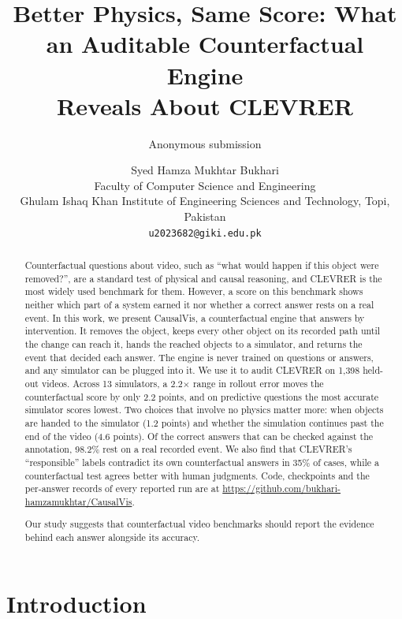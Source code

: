 \documentclass[10pt,twocolumn,letterpaper]{article}
\title{Better Physics, Same Score: What an Auditable Counterfactual Engine\\Reveals About CLEVRER}
\author{Anonymous submission}
\author{Syed Hamza Mukhtar Bukhari\\
  Faculty of Computer Science and Engineering\\
  Ghulam Ishaq Khan Institute of Engineering Sciences and Technology, Topi, Pakistan\\
  {\tt\small u2023682@giki.edu.pk}}
\date{}
\newif\ifanon
\newcommand{\sys}{CausalVis}
\begin{document}
\maketitle

\begin{abstract}
Counterfactual questions about video, such as ``what would happen if this object were removed?'', are a standard test of physical and causal reasoning, and CLEVRER is the most widely used benchmark for them.
However, a score on this benchmark shows neither which part of a system earned it nor whether a correct answer rests on a real event.
In this work, we present \sys{}, a counterfactual engine that answers by intervention.
It removes the object, keeps every other object on its recorded path until the change can reach it, hands the reached objects to a simulator, and returns the event that decided each answer.
The engine is never trained on questions or answers, and any simulator can be plugged into it.
We use it to audit CLEVRER on 1,398 held-out videos.
Across 13 simulators, a 2.2$\times$ range in rollout error moves the counterfactual score by only 2.2 points, and on predictive questions the most accurate simulator scores lowest.
Two choices that involve no physics matter more: when objects are handed to the simulator (1.2 points) and whether the simulation continues past the end of the video (4.6 points).
Of the correct answers that can be checked against the annotation, 98.2\% rest on a real recorded event.
We also find that CLEVRER's ``responsible'' labels contradict its own counterfactual answers in 35\% of cases, while a counterfactual test agrees better with human judgments.
\ifanon Code, checkpoints and the per-answer records of every reported run will be released.

\else Code, checkpoints and the per-answer records of every reported run are at {\small \url{https://github.com/bukhari-hamzamukhtar/CausalVis}}.

\fi
Our study suggests that counterfactual video benchmarks should report the evidence behind each answer alongside its accuracy.
\end{abstract}

\section{Introduction}
\label{sec:intro}
\end{document}
